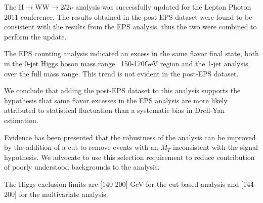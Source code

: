 
The H$\to$WW$\to2l2\nu$ analysis was successfully updated for the
Lepton Photon 2011 conference. The results obtained in the post-EPS
dataset were found to be consistent with the results from the EPS
analysis, thus the two were combined to perform the update.

The EPS counting analysis indicated an excess in the same flavor final
state, both in the 0-jet Higgs boson mass range ~150-170GeV region and
the 1-jet analysis over the full mass range.  This trend is not
evident in the post-EPS dataset.

We conclude that adding the post-EPS dataset to this analysis
supports the hypothesis that same flavor excesses in the EPS
analysis are more likely attributed to statistical fluctuation
than a systematic bias in Drell-Yan estimation.

Evidence has been presented that the robustness of the analysis can be
improved by the addition of a cut to remove events with an $M_T$
inconsistent with the signal hypothesis. We advocate to use this
selection requirement to reduce contribution of poorly understood
backgrounds to the analysis.

The Higgs exclusion limits are [140-200] GeV for the cut-based analysis and
[144-200] for the multivariate analysis.


